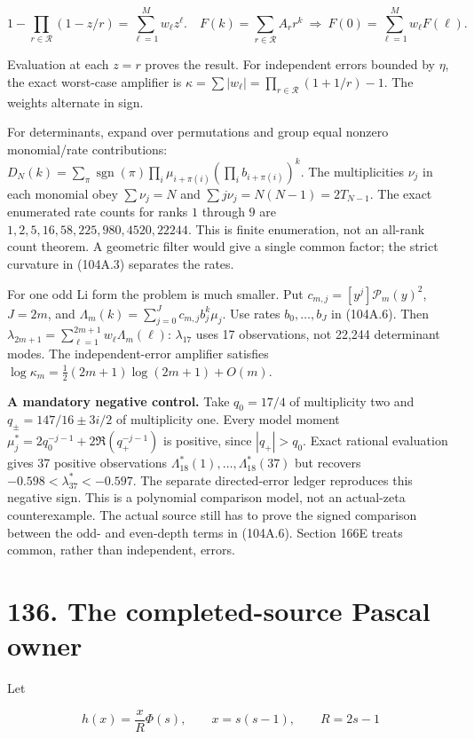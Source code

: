 \documentclass[
  11pt,
]{book}
\begin{document}
\[
1-\prod_{r\in\mathcal R}(1-z/r)=\sum_{\ell=1}^M w_\ell z^\ell.
\quad
F(k)=\sum_{r\in\mathcal R}A_rr^k
\ \Longrightarrow\ F(0)=\sum_{\ell=1}^M w_\ell F(\ell).
\tag{104A.6}
\]

Evaluation at each \(z=r\) proves the result. For independent errors
bounded by \(\eta\), the exact worst-case amplifier is
\(\kappa=\sum|w_\ell|=\prod_{r\in\mathcal R}(1+1/r)-1\). The weights
alternate in sign.

For determinants, expand over permutations and group equal nonzero
monomial/rate contributions:
\(D_N(k)=\sum_\pi\operatorname{sgn}(\pi)\prod_i\mu_{i+\pi(i)}
(\prod_i b_{i+\pi(i)})^k\). The multiplicities \(\nu_j\) in each
monomial obey \(\sum\nu_j=N\) and \(\sum j\nu_j=N(N-1)=2T_{N-1}\). The
exact enumerated rate counts for ranks \(1\) through \(9\) are
\(1,2,5,16,58,225,980,4520,22244\). This is finite enumeration, not an
all-rank count theorem. A geometric filter would give a single common
factor; the strict curvature in (104A.3) separates the rates.

For one odd Li form the problem is much smaller. Put
\(c_{m,j}=[y^j]\mathcal P_m(y)^2\), \(J=2m\), and
\(\Lambda_m(k)=\sum_{j=0}^Jc_{m,j}b_j^k\mu_j\). Use rates
\(b_0,\ldots,b_J\) in (104A.6). Then
\(\lambda_{2m+1}=\sum_{\ell=1}^{2m+1}w_\ell\Lambda_m(\ell)\):
\(\lambda_{17}\) uses 17 observations, not 22,244 determinant modes. The
independent-error amplifier satisfies
\(\log\kappa_m=\tfrac12(2m+1)\log(2m+1)+O(m)\).

\textbf{A mandatory negative control.} Take \(q_0=17/4\) of multiplicity
two and \(q_\pm=147/16\pm3i/2\) of multiplicity one. Every model moment
\(\mu_j^*=2q_0^{-j-1}+2\Re(q_+^{-j-1})\) is positive, since
\(|q_+|>q_0\). Exact rational evaluation gives 37 positive observations
\(\Lambda_{18}^*(1),\ldots,\Lambda_{18}^*(37)\) but recovers
\(-0.598<\lambda_{37}^*<-0.597\). The separate directed-error ledger
reproduces this negative sign. This is a polynomial comparison model,
not an actual-zeta counterexample. The actual source still has to prove
the signed comparison between the odd- and even-depth terms in (104A.6).
Section 166E treats common, rather than independent, errors.

\section{136. The completed-source Pascal
owner}\label{the-completed-source-pascal-owner}

Let

\[
h(x)=\frac{x}{R}\Phi(s),\qquad x=s(s-1),\qquad R=2s-1
\]
\end{document}
